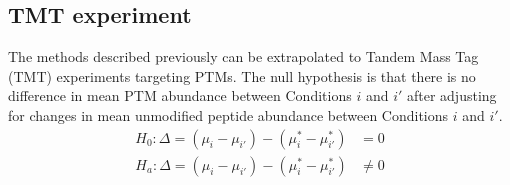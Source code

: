 \documentclass{mcp}
\begin{document}
%

\subsection{TMT experiment}
\label{sec:tmtmethod}

The methods described previously can be extrapolated to Tandem Mass Tag (TMT) experiments targeting PTMs. The null hypothesis is that there is no difference in mean PTM abundance between Conditions $i$ and $i'$ after adjusting for changes in mean unmodified peptide abundance between Conditions $i$ and $i'$. 
\begin{align*}
H_{0}: \Delta = (\mu_{i} - \mu_{i'}) - (\mu_{i}^{\ast} - \mu_{i'}^{\ast}) &= 0 \\
H_{a}: \Delta = (\mu_{i} - \mu_{i'}) - (\mu_{i}^{\ast} - \mu_{i'}^{\ast}) &\neq 0
\end{align*}
\end{document}
